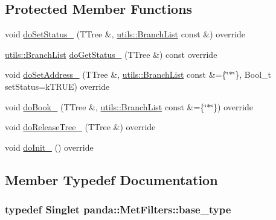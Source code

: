 \subsection*{Protected Member Functions}
\begin{DoxyCompactItemize}
\item 
void \hyperlink{classpanda_1_1MetFilters_a48c76c6289784dda542350d88e05aa66}{doSetStatus\_\-} (TTree \&, \hyperlink{classpanda_1_1utils_1_1BranchList}{utils::BranchList} const \&) override
\item 
\hyperlink{classpanda_1_1utils_1_1BranchList}{utils::BranchList} \hyperlink{classpanda_1_1MetFilters_ad31a44df0eb98f6402c27fe8cf95b7e3}{doGetStatus\_\-} (TTree \&) const override
\item 
void \hyperlink{classpanda_1_1MetFilters_a152d3969ea9e1518b8fceda3bc93bf81}{doSetAddress\_\-} (TTree \&, \hyperlink{classpanda_1_1utils_1_1BranchList}{utils::BranchList} const \&=\{\char`\"{}$\ast$\char`\"{}\}, Bool\_\-t setStatus=kTRUE) override
\item 
void \hyperlink{classpanda_1_1MetFilters_aa5205e813804df7244ed74a998bf7968}{doBook\_\-} (TTree \&, \hyperlink{classpanda_1_1utils_1_1BranchList}{utils::BranchList} const \&=\{\char`\"{}$\ast$\char`\"{}\}) override
\item 
void \hyperlink{classpanda_1_1MetFilters_af78e81492c5936f34a5468848218396e}{doReleaseTree\_\-} (TTree \&) override
\item 
void \hyperlink{classpanda_1_1MetFilters_ad21514fd645e1f82276f055f112ad7c4}{doInit\_\-} () override
\end{DoxyCompactItemize}


\subsection{Member Typedef Documentation}
\hypertarget{classpanda_1_1MetFilters_aa9b343ca5027d2786a87123abe1b0630}{
\subsubsection[{base\_\-type}]{\setlength{\rightskip}{0pt plus 5cm}typedef {\bf Singlet} {\bf panda::MetFilters::base\_\-type}}}
\label{classpanda_1_1MetFilters_aa9b343ca5027d2786a87123abe1b0630}


